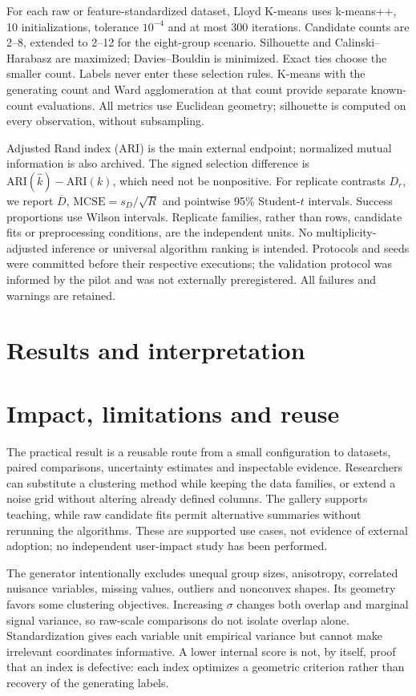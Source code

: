 \documentclass[preprint,12pt]{elsarticle}
\begin{document}
For each raw or feature-standardized dataset, Lloyd K-means uses k-means++,
10 initializations, tolerance $10^{-4}$ and at most 300 iterations. Candidate
counts are 2--8, extended to 2--12 for the eight-group scenario. Silhouette and
Calinski--Harabasz are maximized; Davies--Bouldin is minimized. Exact ties choose
the smaller count. Labels never enter these selection rules. K-means with the
generating count and Ward agglomeration at that count provide separate
known-count evaluations. All metrics use Euclidean geometry; silhouette is
computed on every observation, without subsampling.

Adjusted Rand index (ARI) is the main external endpoint; normalized mutual
information is also archived. The signed selection difference is
$\mathrm{ARI}(\widehat{k})-\mathrm{ARI}(k)$, which need not be nonpositive.
For replicate contrasts $D_r$, we report $\overline D$,
$\mathrm{MCSE}=s_D/\sqrt R$ and pointwise 95\% Student-$t$ intervals.
Success proportions use Wilson intervals. Replicate families, rather than
rows, candidate fits or preprocessing conditions, are the independent units.
No multiplicity-adjusted inference or universal algorithm ranking is intended.
Protocols and seeds were committed before their respective executions;
the validation protocol was informed by the pilot and was not externally
preregistered. All failures and warnings are retained.

\section{Results and interpretation}


\section{Impact, limitations and reuse}
The practical result is a reusable route from a small configuration to
datasets, paired comparisons, uncertainty estimates and inspectable evidence.
Researchers can substitute a clustering method while keeping the data families,
or extend a noise grid without altering already defined columns. The gallery
supports teaching, while raw candidate fits permit alternative summaries
without rerunning the algorithms. These are supported use cases, not evidence
of external adoption; no independent user-impact study has been performed.

The generator intentionally excludes unequal group sizes, anisotropy,
correlated nuisance variables, missing values, outliers and nonconvex shapes.
Its geometry favors some clustering objectives. Increasing $\sigma$ changes
both overlap and marginal signal variance, so raw-scale comparisons do not
isolate overlap alone. Standardization gives each variable unit empirical
variance but cannot make irrelevant coordinates informative. A lower internal
score is not, by itself, proof that an index is defective: each index optimizes
a geometric criterion rather than recovery of the generating labels.
\end{document}
